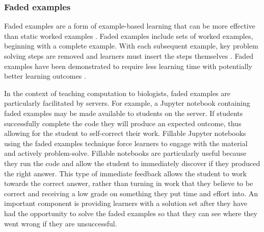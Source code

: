 \subsubsection{Faded examples}\label{Fillable} 
Faded examples are a form of example-based learning that can be more effective than static worked examples \citep{schwonke_worked-example_2009}.
Faded examples include sets of worked examples, beginning with a complete example. 
With each subsequent example, key problem solving steps are removed and learners must insert the steps themselves \citep{renkl_toward_2014}. 
Faded examples have been demonstrated to require less learning time with potentially better learning outcomes \citep{schwonke_worked-example_2009}. 

In the context of teaching computation to biologists, faded examples are particularly facilitated by servers.
For example, a Jupyter notebook containing faded examples may be made available to students on the server.
If students successfully complete the code they will produce an expected outcome, thus allowing for the student to self-correct their work.
Fillable Jupyter notebooks using the faded examples technique force learners to engage with the material and actively problem-solve. 
Fillable notebooks are particularly useful because they run the code and allow the student to immediately discover if they produced the right answer. 
This type of immediate feedback allows the student to work towards the correct answer, rather than turning in work that they believe to be correct and receiving a low grade on something they put time and effort into.
An important component is providing learners with a solution set after they have had the opportunity to solve the faded examples so that they can see where they went wrong if they are unsuccessful.

